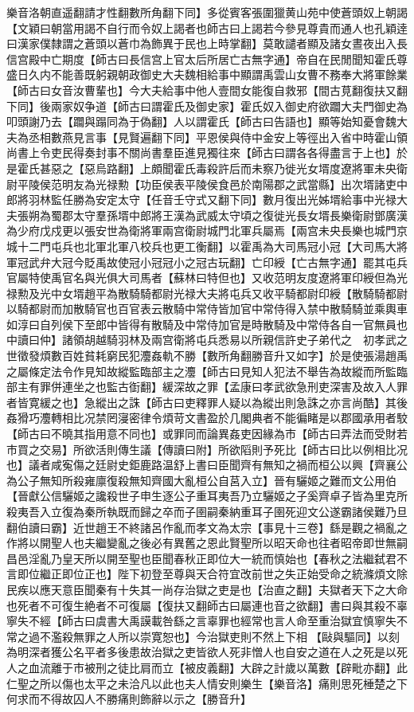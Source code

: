 樂音洛朝直遥翻請才性翻數所角翻下同】多從賓客張圍獵黄山苑中使蒼頭奴上朝謁【文穎曰朝當用謁不自行而令奴上謁者也師古曰上謁若今參見尊貴而通人也孔穎逹曰漢家僕隸謂之蒼頭以蒼巾為飾異于民也上時掌翻】莫敢譴者顯及諸女晝夜出入長信宫殿中亡期度【師古曰長信宫上官太后所居亡古無字通】帝自在民閒聞知霍氏尊盛日久内不能善既躬親朝政御史大夫魏相給事中顯謂禹雲山女曹不務奉大將軍餘業【師古曰女音汝曹輩也】今大夫給事中他人壹間女能復自救邪【間古莧翻復扶又翻下同】後兩家奴争道【師古曰謂霍氏及御史家】霍氏奴入御史府欲躢大夫門御史為叩頭謝乃去【躢與蹋同為于偽翻】人以謂霍氏【師古曰告語也】顯等始知憂會魏大夫為丞相數燕見言事【見賢遍翻下同】平恩侯與侍中金安上等徑出入省中時霍山領尚書上令吏民得奏封事不關尚書羣臣進見獨往來【師古曰謂各各得盡言于上也】於是霍氏甚惡之【惡烏路翻】上頗聞霍氏毒殺許后而未察乃徙光女壻度遼將軍未央衛尉平陵侯范明友為光禄勲【功臣侯表平陵侯食邑於南陽郡之武當縣】出次壻諸吏中郎將羽林監任勝為安定太守【任音壬守式又翻下同】數月復出光姊壻給事中光禄大夫張朔為蜀郡太守羣孫壻中郎將王漢為武威太守頃之復徙光長女壻長樂衛尉鄧廣漢為少府戊戍更以張安世為衛將軍兩宫衛尉城門北軍兵屬焉【兩宫未央長樂也城門京城十二門屯兵也北軍北軍八校兵也更工衡翻】以霍禹為大司馬冠小冠【大司馬大將軍冠武弁大冠今貶禹故使冠小冠冠小之冠古玩翻】亡印綬【亡古無字通】罷其屯兵官屬特使禹官名與光俱大司馬者【蘇林曰特但也】又收范明友度遼將軍印綬但為光禄勲及光中女壻趙平為散騎騎都尉光禄大夫將屯兵又收平騎都尉印綬【散騎騎都尉以騎都尉而加散騎官也百官表云散騎中常侍皆加官中常侍得入禁中散騎騎並乘輿車如淳曰自列侯下至郎中皆得有散騎及中常侍加官是時散騎及中常侍各自一官無員也中讀曰仲】諸領胡越騎羽林及兩宫衛將屯兵悉易以所親信許史子弟代之　初孝武之世徵發煩數百姓貧耗窮民犯灋姦軌不勝【數所角翻勝音升又如字】於是使張湯趙禹之屬條定法令作見知故縱監臨部主之灋【師古曰見知人犯法不舉告為故縱而所監臨部主有罪併連坐之也監古衘翻】緩深故之罪【孟康曰孝武欲急刑吏深害及故入人罪者皆寛緩之也】急縱出之誅【師古曰吏釋罪人疑以為縱出則急誅之亦言尚酷】其後姦猾巧灋轉相比况禁罔寖密律令煩苛文書盈於几閣典者不能徧睹是以郡國承用者駮【師古曰不曉其指用意不同也】或罪同而論異姦吏因緣為市【師古曰弄法而受財若市買之交易】所欲活則傳生議【傳讀曰附】所欲䧟則予死比【師古曰比以例相比况也】議者咸寃傷之廷尉史鉅鹿路温舒上書曰臣聞齊有無知之禍而桓公以興【齊襄公為公子無知所殺雍廪復殺無知齊國大亂桓公自莒入立】晉有驪姬之難而文公用伯【晉獻公信驪姬之讒殺世子申生逐公子重耳夷吾乃立驪姬之子奚齊卓子皆為里克所殺夷吾入立復為秦所執既而歸之卒而子圉嗣秦納重耳子圉死迎文公遂霸諸侯難乃旦翻伯讀曰霸】近世趙王不終諸呂作亂而孝文為太宗【事見十三卷】繇是觀之禍亂之作將以開聖人也夫繼變亂之後必有異舊之恩此賢聖所以昭天命也往者昭帝即世無嗣昌邑淫亂乃皇天所以開至聖也臣聞春秋正即位大一統而慎始也【春秋之法繼弑君不言即位繼正即位正也】陛下初登至尊與天合符宜改前世之失正始受命之統滌煩文除民疾以應天意臣聞秦有十失其一尚存治獄之吏是也【治直之翻】夫獄者天下之大命也死者不可復生絶者不可復屬【復扶又翻師古曰屬連也音之欲翻】書曰與其殺不辜寧失不經【師古曰虞書大禹謨載咎繇之言辜罪也經常也言人命至重治獄宜慎寧失不常之過不濫殺無罪之人所以崇寛恕也】今治獄吏則不然上下相【敺與驅同】以刻為明深者獲公名平者多後患故治獄之吏皆欲人死非憎人也自安之道在人之死是以死人之血流離于市被刑之徒比肩而立【被皮義翻】大辟之計歲以萬數【辟毗亦翻】此仁聖之所以傷也太平之未洽凡以此也夫人情安則樂生【樂音洛】痛則思死棰楚之下何求而不得故囚人不勝痛則飾辭以示之【勝音升】